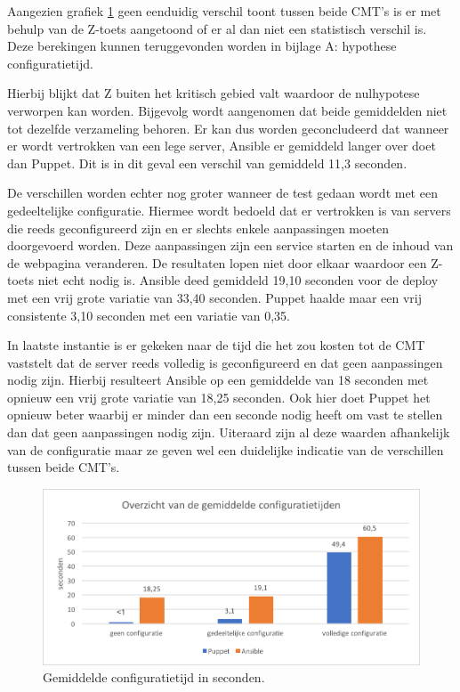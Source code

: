 Aangezien grafiek \ref{fig:deploytime_fullconfig} geen eenduidig verschil toont tussen beide \gls{CMT}'s is er met behulp van de Z-toets aangetoond of er al dan niet een statistisch verschil is. Deze berekingen kunnen teruggevonden worden in bijlage A: hypothese configuratietijd.

Hierbij blijkt dat Z buiten het kritisch gebied valt waardoor de nulhypotese verworpen kan worden. Bijgevolg wordt aangenomen dat beide gemiddelden niet tot dezelfde verzameling behoren. Er kan dus worden geconcludeerd dat wanneer er wordt vertrokken van een lege server, Ansible er gemiddeld langer over doet dan Puppet. Dit is in dit geval een verschil van gemiddeld 11,3 seconden. 

De verschillen worden echter nog groter wanneer de test gedaan wordt met een gedeeltelijke configuratie. Hiermee wordt bedoeld dat er vertrokken is van servers die reeds geconfigureerd zijn en er slechts enkele aanpassingen moeten doorgevoerd worden. Deze aanpassingen zijn een service starten en de inhoud van de webpagina veranderen. De resultaten lopen niet door elkaar waardoor een Z-toets niet echt nodig is. Ansible deed gemiddeld 19,10 seconden voor de deploy met een vrij grote variatie van 33,40 seconden. Puppet haalde maar een vrij consistente 3,10 seconden met een variatie van 0,35.

In laatste instantie is er gekeken naar de tijd die het zou kosten tot de \gls{CMT} vaststelt dat de server reeds volledig is geconfigureerd en dat geen aanpassingen nodig zijn. Hierbij resulteert Ansible op een gemiddelde van 18 seconden met opnieuw een vrij grote variatie van 18,25 seconden. Ook hier doet Puppet het opnieuw beter waarbij er minder dan een seconde nodig heeft om vast te stellen dan dat geen aanpassingen nodig zijn. Uiteraard zijn al deze waarden afhankelijk van de configuratie maar ze geven wel een duidelijke indicatie van de verschillen tussen beide \gls{CMT}'s.

\begin{figure}
	\includegraphics[width=\linewidth]{img/overzichtgemiddeldeconfigtijd.png} 
	\caption{Gemiddelde configuratietijd in seconden.}  
	\label{fig:deploytime_fullconfig}
\end{figure}

